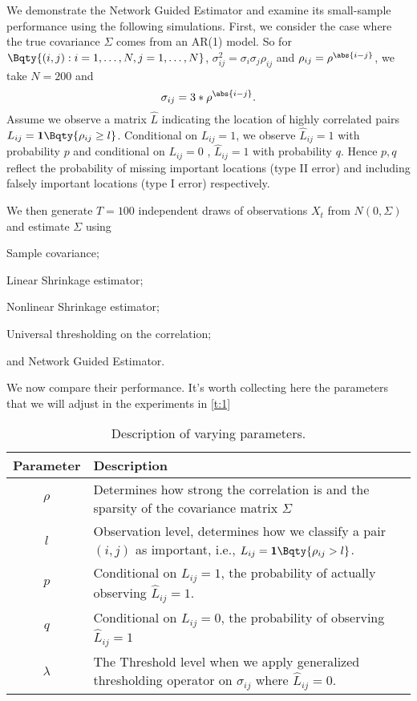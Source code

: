 We demonstrate the Network Guided Estimator and examine its small-sample performance using the following simulations. First, we consider the case where the true covariance \(\Sigma\) comes from an AR(1) model. So for \(\Bqty{(i,j): i =1 ,\dots, N, j = 1,\dots,N} \), \(\sigma_{ij}^{2} = \sigma_{i}\sigma_{j} \rho_{ij}\) and \(\rho_{ij} = \rho^{\abs{i - j}}\), we take \(N = 200\) and  
\begin{equation*}
     \sigma_{ij} = 3 * \rho^{\abs{i - j}}. 
\end{equation*}
Assume we observe a matrix \(\hat{L}\) indicating the location of highly correlated pairs \(L_{ij} = \mathbf{1}\Bqty{\rho_{ij} \geq l}\). Conditional on \(L_{ij} = 1\), we observe \(\hat{L}_{ij}= 1\) with probability \(p\) and conditional on \(L_{ij}  =0\) , \(\hat{L}_{ij}  =1\) with probability \(q\). Hence \(p,q\) reflect the probability of missing important locations (type \RN{2} error) and including falsely important locations (type \RN{1} error) respectively. 

We then generate \(T = 100\) independent draws of observations \(X_{t}\) from \(N(0, \Sigma)\) and estimate \(\Sigma\) using 
\begin{enumerate*}
     \item Sample covariance;
     \item Linear Shrinkage estimator;
     \item Nonlinear Shrinkage estimator;
     \item Universal thresholding on the correlation;
     \item and Network Guided Estimator. 
\end{enumerate*}
We now compare their performance. It's worth collecting here the parameters that we will adjust in the experiments in \autoref{t:1}
\begin{table}[htbp]
     \centering\begin{tabularx}{\textwidth}{c|X}
          \toprule
          Parameter & Description \\ 
          \midrule
          \(\rho\) & Determines how strong the correlation is and the sparsity of the covariance matrix \(\Sigma\) \\
          \(l\) & Observation level, determines how we classify a pair \((i,j)\) as important, i.e., \(L_{ij} =\mathbf{1}\Bqty{\rho_{ij} > l}\). \\
          \(p\) & Conditional on \(L_{ij} =1\), the probability of actually observing \(\hat{L}_{ij} =1\). \\
          \(q\) & Conditional on \(L_{ij} = 0\), the probability of  observing \(\hat{L}_{ij} =1\)\\
          \(\lambda\)& The Threshold level when we apply generalized thresholding operator on \(\sigma_{ij}\) where \(\hat{L}_{ij} = 0\). \\
          \bottomrule
     \end{tabularx}
     \caption{Description of varying parameters.}
     \label{t:1}
\end{table}



